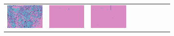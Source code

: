 \documentclass{ipol}
\begin{document}
\begin{figure}[ht]
\begin{subfigure}[t]{\linewidth}
\begin{tabular}{ccccccccc}
                \includegraphics[width=\s]{images/carnival/DHT/bid_64_grids.png}&
                \includegraphics[width=\s]{images/carnival/LINEAR/bid_64_grids.png}&
                \includegraphics[width=\s]{images/carnival/PPG/bid_64_grids.png}&

\end{tabular}
\end{subfigure}
\end{figure}
\end{document}
